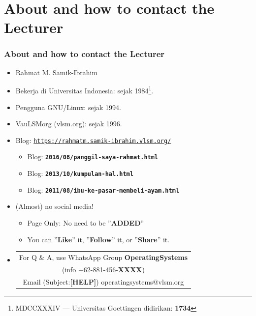 \documentclass[xcolor=table, notheorems, hyperref={pdfpagelabels=false}]{beamer}
\begin{document}
\section{About and how to contact the Lecturer}
\begin{frame}
\frametitle{About and how to contact the Lecturer}
\begin{itemize}
\item Rahmat M. Samik-Ibrahim
\item Bekerja di Universitas Indonesia: sejak 1984\footnote{%
      MDCCXXXIV --- Universitas Goettingen didirikan: \textbf{1734}}.
\item Pengguna GNU/Linux: sejak 1994.
\item VauLSMorg (vlsm.org): sejak 1996.
\item Blog: \texttt{\url{https://rahmatm.samik-ibrahim.vlsm.org/}}
\begin{itemize}
\item Blog: \texttt{\textbf{2016/08/panggil-saya-rahmat.html}}
\item Blog: \texttt{\textbf{2013/10/kumpulan-hal.html}}
\item Blog: \texttt{\textbf{2011/08/ibu-ke-pasar-membeli-ayam.html}}
\end{itemize}
\item (Almost) no social media!
\begin{itemize}
\item Page Only: No need to be ''\textbf{ADDED}''
\item You can ''\textbf{Like}'' it, ''\textbf{Follow}'' it, or ''\textbf{Share}'' it.
\end{itemize}
\item \begin{tabular}{|c|}
\hline
For Q \& A, use WhatsApp Group \textbf{OperatingSystems}\\
(info +62-881-456-\textbf{XXXX}) \\
Email (Subject:\textbf{[HELP]}) operatingsystems@vlsm.org\\
\hline
\end{tabular}
\end{itemize}
\end{frame}
\end{document}
